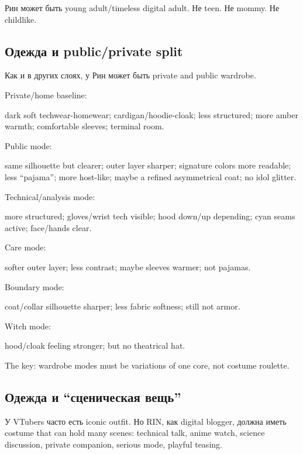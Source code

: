 Рин может быть young adult/\hspace{0pt}timeless digital adult. Не teen. Не mommy. Не
childlike.

\subsection*{Одежда и public/\hspace{0pt}private split}

Как и в других слоях, у Рин может быть private and public wardrobe.

Private/\hspace{0pt}home baseline:

dark soft techwear-homewear; cardigan/\hspace{0pt}hoodie-cloak; less structured;
more amber warmth; comfortable sleeves; terminal room.

Public mode:

same silhouette but clearer; outer layer sharper; signature colors more
readable; less ``pajama''; more host-like; maybe a refined asymmetrical
coat; no idol glitter.

Technical/\hspace{0pt}analysis mode:

more structured; gloves/\hspace{0pt}wrist tech visible; hood down/\hspace{0pt}up depending; cyan
seams active; face/\hspace{0pt}hands clear.

Care mode:

softer outer layer; less contrast; maybe sleeves warmer; not pajamas.

Boundary mode:

coat/\hspace{0pt}collar silhouette sharper; less fabric softness; still not armor.

Witch mode:

hood/\hspace{0pt}cloak feeling stronger; but no theatrical hat.

The key: wardrobe modes must be variations of one core, not costume
roulette.

\subsection*{Одежда и ``сценическая вещь''}

У VTubers часто есть iconic outfit. Но RIN, как digital blogger, должна
иметь costume that can hold many scenes: technical talk, anime watch,
science discussion, private companion, serious mode, playful teasing.

